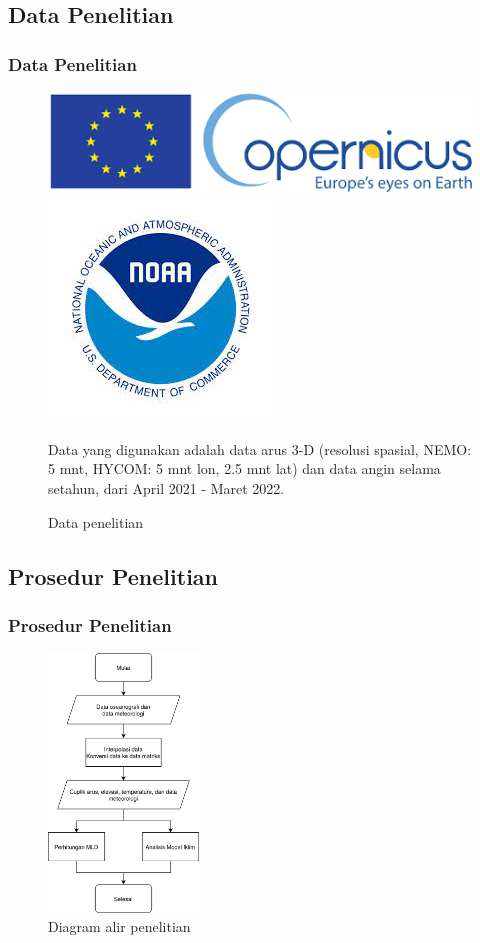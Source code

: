 \documentclass{beamer}
\begin{document}
\subsection{Data Penelitian}
\begin{frame}
	\frametitle{Data Penelitian}
	\begin{figure}[H]
		\centering
		\includegraphics[width=.5\textwidth]{logo_cmmes.png}
		\\[\smallskipamount]
		\includegraphics[width=.24\textwidth]{logo_ncep.jpeg}
		\caption{Data penelitian}
		\label{fig:data}
		\tiny
		Data yang digunakan adalah data arus 3-D (resolusi spasial, NEMO: 5 mnt, HYCOM: 5 mnt lon, 2.5 mnt lat) dan data angin selama setahun, dari April 2021 - Maret 2022. 
	\end{figure}
\end{frame}

\subsection{Prosedur Penelitian}
\begin{frame}
	\frametitle{Prosedur Penelitian}
	\begin{figure}[H]
		\centering
		\includegraphics[width=4cm]{flowchart.png}
		\caption{Diagram alir penelitian}
		\label{fig:flowchart}
	\end{figure}
\end{frame}
\ThankYouFrame
\end{document}
